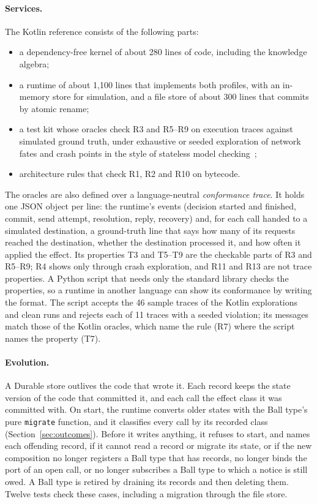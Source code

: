 \documentclass[11pt]{article}
\theoremstyle{definition}
\theoremstyle{plain}
\begin{document}
\paragraph{Services.} The Kotlin reference consists of the following parts:
\begin{itemize}[nosep]
  \item a dependency-free kernel of about 280 lines of code, including the knowledge algebra;
  \item a runtime of about 1{,}100 lines that implements both profiles, with an in-memory store for simulation, and a file store of about 300 lines that commits by atomic rename;
  \item a test kit whose oracles check R3 and R5--R9 on execution traces against simulated ground truth, under exhaustive or seeded exploration of network fates and crash points in the style of stateless model checking~\citep{Godefroid1997VeriSoft};
  \item architecture rules that check R1, R2 and R10 on bytecode.
\end{itemize}
The oracles are also defined over a language-neutral \emph{conformance trace}. It holds one JSON object per line: the runtime's events (decision started and finished, commit, send attempt, resolution, reply, recovery) and, for each call handed to a simulated destination, a ground-truth line that says how many of its requests reached the destination, whether the destination processed it, and how often it applied the effect. Its properties T3 and T5--T9 are the checkable parts of R3 and R5--R9; R4 shows only through crash exploration, and R11 and R13 are not trace properties. A Python script that needs only the standard library checks the properties, so a runtime in another language can show its conformance by writing the format. The script accepts the 46 sample traces of the Kotlin explorations and clean runs and rejects each of 11 traces with a seeded violation; its messages match those of the Kotlin oracles, which name the rule (R7) where the script names the property (T7).

\paragraph{Evolution.} A Durable store outlives the code that wrote it. Each record keeps the state version of the code that committed it, and each call the effect class it was committed with. On start, the runtime converts older states with the Ball type's pure \texttt{migrate} function, and it classifies every call by its recorded class (Section~\ref{sec:outcomes}). Before it writes anything, it refuses to start, and names each offending record, if it cannot read a record or migrate its state, or if the new composition no longer registers a Ball type that has records, no longer binds the port of an open call, or no longer subscribes a Ball type to which a notice is still owed. A Ball type is retired by draining its records and then deleting them. Twelve tests check these cases, including a migration through the file store.
\end{document}
